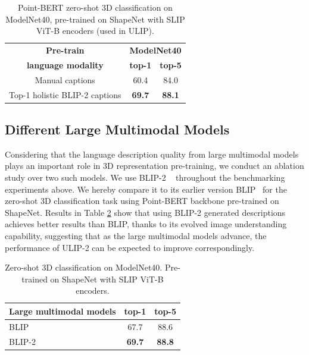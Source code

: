 \documentclass[10pt,twocolumn,letterpaper]{article}
\begin{document}
\begin{table}[h!]
    \centering
    \small
    \begin{tabular}{ccc}
         \toprule
         \textbf{Pre-train} & \multicolumn{2}{l}{
         \textbf{ModelNet40}}\\
         \textbf{language modality} & \textbf{top-1} & \textbf{top-5}\\
         \midrule
         
         Manual captions & 60.4 &  84.0\\
         Top-1 holistic BLIP-2 captions  & \textbf{69.7}
         & \textbf{88.1}
         \\

         \bottomrule
    \end{tabular}
    \caption{Point-BERT zero-shot 3D classification on ModelNet40, pre-trained on ShapeNet with SLIP ViT-B encoders (used in ULIP).}
    \label{tab:ablate-captions}
\end{table}


\subsection{Different Large Multimodal Models}
\label{sec:ablate_large_multimodal_models}
Considering that the language description quality from large multimodal models plays an important role in 3D representation pre-training, we conduct an ablation study over two such models. We use BLIP-2 ~\citep{li2023blip} throughout the benchmarking experiments above. We hereby compare it to its earlier version BLIP~\cite{li2022blip} for the zero-shot 3D classification task using Point-BERT backbone pre-trained on ShapeNet. Results in Table \ref{tab:ablate_large_multimodal_model} show that using BLIP-2 generated descriptions achieves better results than BLIP, thanks to its evolved image understanding capability, suggesting that as the large multimodal models advance, the performance of ULIP-2 can be expected to improve correspondingly.

\begin{table}[h!]
    \centering
    \vspace{-2mm}
    \begin{tabular}{lcc}
        \toprule
        \textbf{Large multimodal models}  & \textbf{top-1} & \textbf{top-5}
        \\
        \midrule
        BLIP \cite{li2022blip} & 67.7 & 88.6 \\
        BLIP-2 \cite{li2023blip} & \textbf{69.7} & \textbf{88.8}\\
        \bottomrule
    \end{tabular}
    \caption{Zero-shot 3D classification on ModelNet40. Pre-trained on ShapeNet with SLIP ViT-B encoders.}
    \label{tab:ablate_large_multimodal_model}
    \vspace{-4mm}
\end{table}
\end{document}
